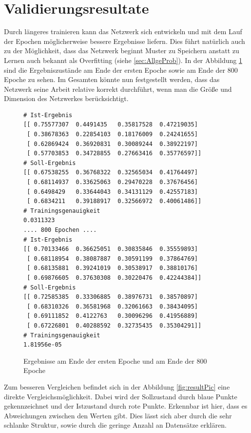 \section{Validierungsresultate}

Durch längeres trainieren kann das Netzwerk sich entwickeln und mit dem Lauf der Epochen möglicherweise bessere Ergebnisse liefern. 
Dies führt natürlich auch zu der Möglichkeit, dass das Netzwerk beginnt Muster zu Speichern anstatt zu Lernen auch bekannt als Overfitting (siehe \ref{sec:AllgeProb}). 
In der Abbildung \ref{fig:runns} sind die Ergebniszustände am Ende der ersten Epoche sowie am Ende der $800$ Epoche zu sehen. 
Im Gesamten könnte nun festgestellt werden, dass das Netzwerk seine Arbeit relative korrekt durchführt, wenn man die Größe und Dimension des Netzwerkes berücksichtigt. 
\begin{figure}[ht!]
\lstset{language=Python}
\begin{lstlisting}
# Ist-Ergebnis 
[[ 0.75577307  0.4491435   0.35817528  0.47219035]
 [ 0.38678363  0.22854103  0.18176009  0.24241655]
 [ 0.62869424  0.36920831  0.30089244  0.38922197]
 [ 0.57703853  0.34728855  0.27663416  0.35776597]]
# Soll-Ergebnis
[[ 0.67538255  0.36768322  0.32565034  0.41764497]
 [ 0.68114937  0.33625063  0.29470228  0.37676456]
 [ 0.6498429   0.33644043  0.34131129  0.42557183]
 [ 0.6834211   0.39188917  0.32566972  0.40061486]]
# Trainingsgenauigkeit
0.0311323
.... 800 Epochen ....
# Ist-Ergebnis
[[ 0.70133466  0.36625051  0.30835846  0.35559893]
 [ 0.68118954  0.38087887  0.30591199  0.37864769]
 [ 0.68135881  0.39241019  0.30538917  0.38810176]
 [ 0.69876605  0.37630308  0.30220476  0.42244384]]
# Soll-Ergebnis
[[ 0.72585385  0.33306885  0.38976731  0.38570897]
 [ 0.68310326  0.36581968  0.32061663  0.38434095]
 [ 0.69111852  0.4122763   0.30096296  0.41956889]
 [ 0.67226801  0.40288592  0.32735435  0.35304291]]
# Trainingsgenauigkeit
1.81956e-05
\end{lstlisting}
	\caption{Ergebnisse am Ende der ersten Epoche und am Ende der $800$ Epoche}
	\label{fig:runns}
\end{figure}
Zum besseren Vergleichen befindet sich in der Abbildung \ref{fig:resultPic} eine direkte Vergleichsmöglichkeit. 
Dabei wird der Sollzustand durch blaue Punkte gekennzeichnet und der Istzustand durch rote Punkte. 
Erkennbar ist hier, dass es Abweichungen zwischen den Werten gibt. 
Dies lässt sich aber durch die sehr schlanke Struktur, sowie durch die geringe Anzahl an Datensätze erklären. 
